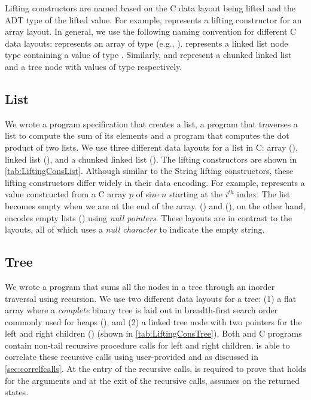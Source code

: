 Lifting constructors are named based on the C data layout being lifted
and the \SpecL{} ADT type of the lifted value.
For example,  represents a  lifting constructor
for an array layout.
In general, we use the following naming convention for different C data layouts:
 represents an array of type  (e.g., ).
 represents a linked list node type containing a value of type .
Similarly,  and  represent a chunked linked list and a tree node
with values of type  respectively.



\subsection{List}
We wrote a \SpecL{} program specification that creates a list, a
program that traverses a list to compute the sum of its elements and a program
that computes the dot product of two lists. We use three different
data layouts for a list in C: array (),
linked list (), and
a chunked linked list ().
The lifting constructors are shown in \cref{tab:LiftingConsList}.
Although similar to the String lifting constructors, these lifting
constructors differ widely in their data encoding. For example,
 represents a  value constructed
from a C array $p$ of size $n$ starting at the $i^{th}$ index. The list becomes empty
when we are at the end of the array. ()
and (), on the other hand, encodes empty
lists () using {\em null pointers}. These layouts are in contrast to the
 layouts, all of which uses a {\em null character} to
indicate the empty string.



\subsection{Tree}
We wrote a \SpecL{} program that sums all the nodes in a tree
through an inorder traversal using recursion. We use two different data layouts for a tree: 
(1) a flat array where a
{\em complete} binary tree is laid out in breadth-first search order commonly used for heaps (),
and (2) a linked tree node with two pointers for the left and right children () (shown in \cref{tab:LiftingConsTree}).
Both \SpecL{} and C programs contain non-tail recursive procedure calls for left and right children.
\toolName{} is able to correlate these recursive calls using user-provided \pre{} and \post{} as discussed in \cref{sec:correlfcalls}.
At the entry of the recursive calls, \toolName{} is required to prove that \pre{} holds for the arguments
and at the exit of the recursive calls, \toolName{} assumes \post{} on the returned states.

